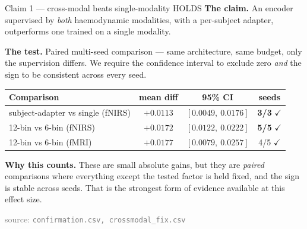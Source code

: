 \documentclass[aspectratio=169,11pt]{beamer}
\newcommand{\yes}{\textcolor{good}{\ensuremath{\checkmark}}}
\newcommand{\src}[1]{{\scriptsize\textcolor{gray}{source: \texttt{#1}}}}
\begin{document}
\begin{frame}{Claim 1 --- cross-modal beats single-modality \quad \textcolor{good}{HOLDS}}
\textbf{The claim.} An encoder supervised by \emph{both} haemodynamic modalities,
with a per-subject adapter, outperforms one trained on a single modality.

\vspace{0.6em}
\textbf{The test.} Paired multi-seed comparison --- same architecture, same
budget, only the supervision differs. We require the confidence interval to
exclude zero \emph{and} the sign to be consistent across every seed.

\begin{center}\small
\begin{tabular}{lccc}
\toprule
Comparison & mean diff & 95\% CI & seeds \\
\midrule
subject-adapter vs single (fNIRS) & $+0.0113$ & $[0.0049,\ 0.0176]$ & \textbf{3/3} \yes \\
12-bin vs 6-bin (fNIRS)           & $+0.0172$ & $[0.0122,\ 0.0222]$ & \textbf{5/5} \yes \\
12-bin vs 6-bin (fMRI)            & $+0.0177$ & $[0.0079,\ 0.0257]$ & 4/5 \yes \\
\bottomrule
\end{tabular}
\end{center}

\vspace{0.6em}
\textbf{Why this counts.} These are small absolute gains, but they are
\emph{paired} comparisons where everything except the tested factor is held
fixed, and the sign is stable across seeds. That is the strongest form of
evidence available at this effect size.

\vspace{0.3em}
\src{confirmation.csv, crossmodal\_fix.csv}
\end{frame}
\end{document}
